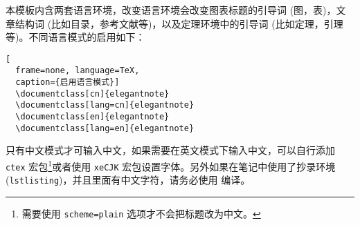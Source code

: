 本模板内含两套语言环境，改变语言环境会改变图表标题的引导词 (图，表)，文章结构词 (比如目录，参考文献等)，以及定理环境中的引导词 (比如定理，引理等)。不同语言模式的启用如下：

\begin{lstlisting}[
  frame=none, language=TeX,
  caption={启用语言模式}]  
  \documentclass[cn]{elegantnote} 
  \documentclass[lang=cn]{elegantnote} 
  \documentclass[en]{elegantnote} 
  \documentclass[lang=en]{elegantnote}
\end{lstlisting}

\begin{note}
只有中文模式才可输入中文，如果需要在英文模式下输入中文，可以自行添加 \lstinline{ctex} 宏包\footnote{需要使用 \lstinline{scheme=plain} 选项才不会把标题改为中文。}或者使用 \lstinline{xeCJK} 宏包设置字体。另外如果在笔记中使用了抄录环境 (\lstinline{lstlisting})，并且里面有中文字符，请务必使用  编译。
\end{note}